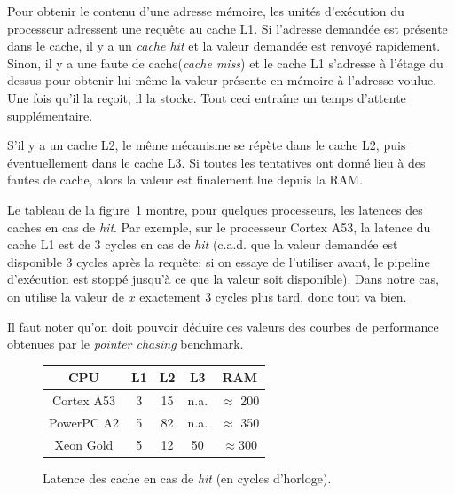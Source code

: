 Pour obtenir le contenu d'une adresse mémoire, les unités d'exécution du
processeur adressent une requête au cache L1. Si l'adresse demandée est présente
dans le cache, il y a un \emph{cache hit} et la valeur demandée est renvoyé
rapidement. Sinon, il y a une \og faute de cache\fg (\emph{cache miss}) et le
cache L1 s'adresse à l'étage du dessus pour obtenir lui-même la valeur présente
en mémoire à l'adresse voulue. Une fois qu'il la reçoit, il la stocke. Tout ceci
entraîne un temps d'attente supplémentaire.

S'il y a un cache L2, le même mécanisme se répète dans le cache L2, puis
éventuellement dans le cache L3. Si toutes les tentatives ont donné lieu à des
fautes de cache, alors la valeur est finalement lue depuis la RAM.

Le tableau de la figure~\ref{tab:cache_lantency} montre, pour quelques
processeurs, les latences des caches en cas de \emph{hit}. Par exemple, sur le
processeur Cortex A53, la latence du cache L1 est de 3 cycles en cas de
\emph{hit} (c.a.d. que la valeur demandée est disponible 3 cycles après la
requête; si on essaye de l'utiliser avant, le pipeline d'exécution est stoppé
jusqu'à ce que la valeur soit disponible). Dans notre cas, on utilise la valeur
de $x$ exactement 3 cycles plus tard, donc tout va bien.

Il faut noter qu'on doit pouvoir déduire ces valeurs des courbes de performance
obtenues par le \emph{pointer chasing} benchmark.

\begin{figure}
  \centering
  \begin{tabular}{|c||c|c|c|c|}
  \hline
  CPU        & L1  & L2    & L3    & RAM \\
  \hline\hline
  Cortex A53 & 3   & 15    & n.a.  & $\approx$ 200 \\
  PowerPC A2 & 5   & 82    & n.a.  & $\approx$ 350        \\
  Xeon Gold  & 5   & 12    & 50    & $\approx 300$  \\
  \hline
\end{tabular}
\caption{Latence des cache en cas de \emph{hit} (en cycles d'horloge). \label{tab:cache_lantency}}
\end{figure}

